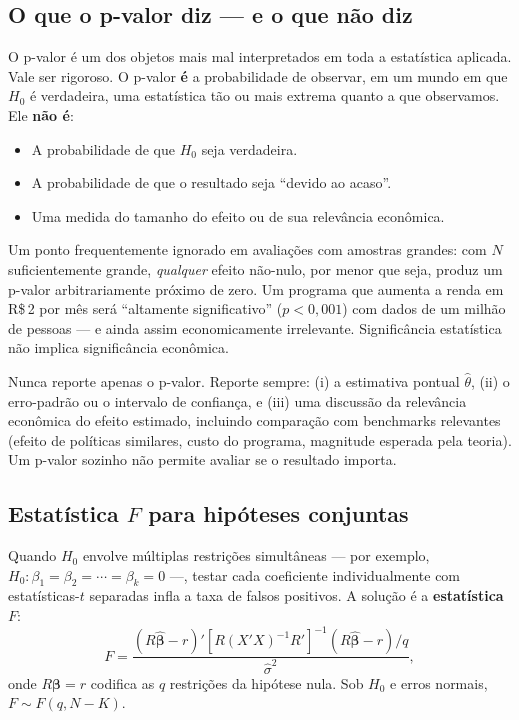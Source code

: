 \subsection*{O que o p-valor diz — e o que não diz}

O p-valor é um dos objetos mais mal interpretados em toda a estatística aplicada. Vale ser rigoroso. O p-valor \textbf{é} a probabilidade de observar, em um mundo em que $H_0$ é verdadeira, uma estatística tão ou mais extrema quanto a que observamos. Ele \textbf{não é}:

\begin{itemize}[leftmargin=*]
  \item A probabilidade de que $H_0$ seja verdadeira.
  \item A probabilidade de que o resultado seja ``devido ao acaso''.
  \item Uma medida do tamanho do efeito ou de sua relevância econômica.
\end{itemize}

Um ponto frequentemente ignorado em avaliações com amostras grandes: com $N$ suficientemente grande, \textit{qualquer} efeito não-nulo, por menor que seja, produz um p-valor arbitrariamente próximo de zero. Um programa que aumenta a renda em R\$\,2 por mês será ``altamente significativo'' ($p < 0{,}001$) com dados de um milhão de pessoas — e ainda assim economicamente irrelevante. Significância estatística não implica significância econômica.

\begin{atencaobox}
Nunca reporte apenas o p-valor. Reporte sempre: (i) a estimativa pontual $\hat{\theta}$, (ii) o erro-padrão ou o intervalo de confiança, e (iii) uma discussão da relevância econômica do efeito estimado, incluindo comparação com benchmarks relevantes (efeito de políticas similares, custo do programa, magnitude esperada pela teoria). Um p-valor sozinho não permite avaliar se o resultado importa.
\end{atencaobox}

\subsection*{Estatística $F$ para hipóteses conjuntas}

Quando $H_0$ envolve múltiplas restrições simultâneas — por exemplo, $H_0: \beta_1 = \beta_2 = \cdots = \beta_k = 0$ —, testar cada coeficiente individualmente com estatísticas-$t$ separadas infla a taxa de falsos positivos. A solução é a \textbf{estatística $F$}:
\begin{equation}
  F = \frac{(R\hat{\boldsymbol{\beta}} - r)'[R(X'X)^{-1}R']^{-1}(R\hat{\boldsymbol{\beta}} - r)/q}%
           {\hat{\sigma}^2},
  \label{eq:estatistica_F}
\end{equation}
onde $R\boldsymbol{\beta} = r$ codifica as $q$ restrições da hipótese nula. Sob $H_0$ e erros normais, $F \sim F(q, N-K)$.

